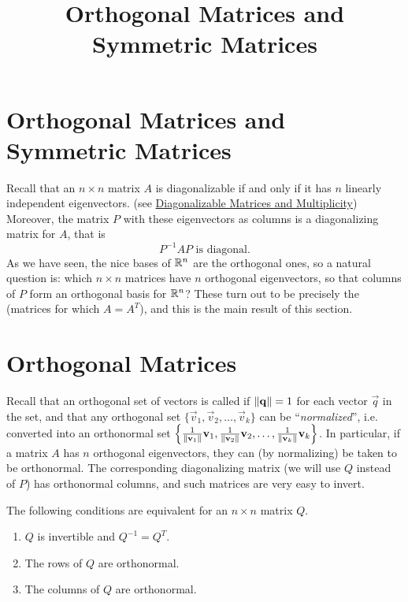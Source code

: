 \documentclass{ximera}
\title{Orthogonal Matrices and Symmetric Matrices} \license{CC BY-NC-SA 4.0}
\begin{document}
\begin{abstract}

\end{abstract}
\maketitle

\section*{Orthogonal Matrices and Symmetric Matrices}
Recall that an $n \times n$ matrix $A$ is diagonalizable if and only if it has $n$ linearly independent eigenvectors.  (see \href{https://ximera.osu.edu/oerlinalg/LinearAlgebra/EIG-0050/main}{Diagonalizable Matrices and Multiplicity}) Moreover, the matrix $P$ with these eigenvectors as columns is a diagonalizing matrix for $A$, that is
\begin{equation*}
P^{-1}AP \mbox{ is diagonal.}
\end{equation*}
As we have seen, the nice bases of $\mathbb{R}^n$ are the orthogonal ones, so a natural question is: which $n \times n$ matrices have $n$ orthogonal eigenvectors, so that columns of $P$ form an orthogonal basis for $\mathbb{R}^n$? These turn out to be precisely the  (matrices for which $A=A^T$), and this is the main result of this section.

\section*{Orthogonal Matrices}
Recall that an orthogonal set of vectors is called  if $\left\lVert\mathbf{q}\right\rVert = 1$ for each vector $\vec{q}$ in the set, and that any orthogonal set $\{\vec{v}_{1}, \vec{v}_{2}, \dots, \vec{v}_{k}\}$ can be ``\textit{normalized}'', i.e. converted into an orthonormal set $\left\{ \frac{1}{\left\lVert\mathbf{v}_{1}\right\rVert}\mathbf{v}_{1}, \frac{1}{\left\lVert\mathbf{v}_{2}\right\rVert}\mathbf{v}_{2}, \dots, \frac{1}{\left\lVert\mathbf{v}_{k}\right\rVert}\mathbf{v}_{k} \right\}$. In particular, if a matrix $A$ has $n$ orthogonal eigenvectors, they can (by normalizing) be taken to be orthonormal. The corresponding diagonalizing matrix (we will use $Q$ instead of $P$) has orthonormal columns, and such matrices are very easy to invert.


\begin{theorem}\label{th:orthogonal_matrices}
The following conditions are equivalent for an $n \times n$ matrix $Q$.

\begin{enumerate}
\item\label{th:orthogonal_matrices_a} $Q$ is invertible and $Q^{-1} = Q^{T}$.

\item\label{th:orthogonal_matrices_b} The rows of $Q$ are orthonormal.

\item\label{th:orthogonal_matrices_c} The columns of $Q$ are orthonormal.

\end{enumerate}
\end{theorem}
\end{document}
